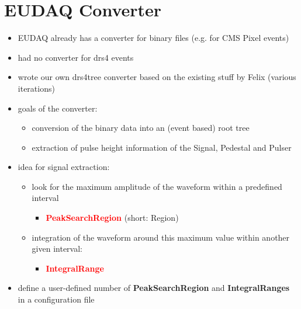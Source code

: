 \documentclass[9pt]{beamer}
\begin{document}
\section{EUDAQ Converter}
\begin{frame}
	\begin{itemize}
		\setlength{\itemsep}{\fill}
		\item EUDAQ already has a converter for binary files (e.g. for CMS Pixel events)
		\item had no converter for drs4 events
		\item wrote our own drs4tree converter based on the existing stuff by Felix (various iterations)
		\item goals of the converter:
		\begin{itemize}
			\item conversion of the binary data into an (event based) root tree
			\item extraction of pulse height information of the Signal, Pedestal and Pulser
		\end{itemize}
		\item idea for signal extraction:
		\begin{itemize}
			\item look for the maximum amplitude of the waveform within a predefined interval
			\begin{itemize}
				\item \textcolor{red}{\textbf{PeakSearchRegion}} (short: Region)
			\end{itemize}
			\item integration of the waveform around this maximum value within another given interval: 
			\begin{itemize}
				\item \textcolor{red}{\textbf{IntegralRange}}
			\end{itemize}
		\end{itemize}
	\item define a user-defined number of \textbf{PeakSearchRegion} and \textbf{IntegralRanges} in a configuration file
	\end{itemize}
\end{frame}
\end{document}
